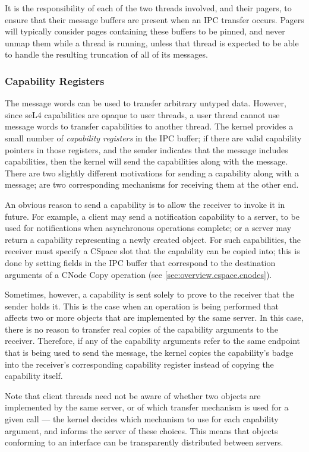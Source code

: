 It is the responsibility of each of the two
threads involved, and their pagers, to ensure that their message buffers are
present when an IPC transfer occurs. Pagers will typically consider pages
containing these buffers to be pinned, and never unmap them while a thread is
running, unless that thread is expected to be able to handle the resulting 
truncation of all of its messages.

\subsubsection{Capability Registers}

The message words can be used to transfer arbitrary untyped data. However, since seL4 capabilities are opaque to user threads, a user thread cannot use message words to transfer capabilities to another thread. The kernel provides a small number of \emph{capability registers} in the IPC buffer; if there are valid capability pointers in those registers, and the sender indicates that the message includes capabilities, then the kernel will send the capabilities along with the message. There are two slightly different motivations for sending a capability along with a message; are two corresponding mechanisms for receiving them at the other end. 

An obvious reason to send a capability is to allow the receiver to invoke it in future. For example, a client may send a notification capability to a server, to be used for notifications when asynchronous operations complete; or a server may return a capability representing a newly created object. For such capabilities, the receiver must specify a CSpace slot that the capability can be copied into; this is done by setting fields in the IPC buffer that correspond to the destination arguments of a CNode Copy operation (see \autoref{sec:overview.cspace.cnodes}).

Sometimes, however, a capability is sent solely to prove to the receiver that the sender holds it. This is the case when an operation is being performed that affects two or more objects that are implemented by the same server. In this case, there is no reason to transfer real copies of the capability arguments to the receiver. Therefore, if any of the capability arguments refer to the same endpoint that is being used to send the message, the kernel copies the capability's badge into the receiver's corresponding capability register instead of copying the capability itself.

Note that client threads need not be aware of whether two objects are implemented by the same server, or of which transfer mechanism is used for a given call --- the kernel decides which mechanism to use for each capability argument, and informs the server of these choices. This means that objects conforming to an interface can be transparently distributed between servers.

